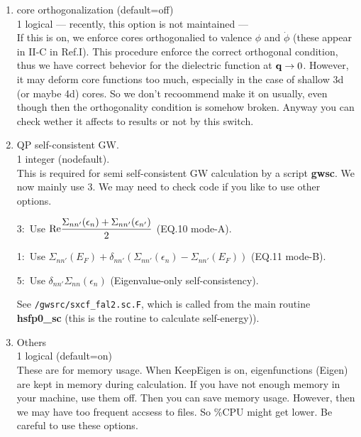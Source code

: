 \documentclass[a4paper,10pt,epsf,fleqn]{article}
\newcommand{\GW}{$GW$}
\newcommand{\keyw}[1]{\fbox{\tt #1}}
\newcommand{\ds}{\displaystyle}
\newcommand{\exe}[1]{{\bf #1}}
\begin{document}
{\begin{enumerate}

\item core orthogonalization (default=off)\\
\keyw{CoreOrth} 1 logical --- recently, this option is not maintained ---\\
If this is on, we enforce cores orthogonalied to valence 
$\phi$ and $\dot{\phi}$ (these appear in II-C in Ref.I).
This procedure enforce the correct orthogonal condition, thus
we have correct behevior for the dielectric function at ${\bf q} \to 0$.
However, it may deform core functions too much, 
especially in the case of shallow 3d (or maybe 4d) cores.
So we don't recoommend make it on usually, even though then 
the orthogonality condition is somehow broken.
Anyway you can check wether it affects to results or not by this switch.


\item QP self-consistent GW.\\
\keyw{iSigMode} 1 integer (nodefault).\\
This is required for semi self-consistent GW calculation by a script {\bf gwsc}.
We now mainly use 3. We may need to check code if you like to use other
options.

3:\ Use $\ds {\rm Re}\frac{\Sigma_{nn'}(\epsilon_n)+\Sigma_{nn'}(\epsilon_{n'})}{2}$
  (EQ.10 mode-A).

1:\ Use $\ds \Sigma_{nn'}(E_F) + \delta_{nn'}(\Sigma_{nn'}(\epsilon_n)-\Sigma_{nn'}(E_F))$
   (EQ.11 mode-B).

5:\ Use $\ds \delta_{nn'} \Sigma_{nn}(\epsilon_n)$ (Eigenvalue-only self-consistency).

See \verb#/gwsrc/sxcf_fal2.sc.F#, which is called from the main routine
      \exe{hsfp0\_sc} (this is the routine to calculate self-energy)).

\item Others\\
\keyw{KeepEigen} 1 logical (default=on) \\
These are for memory usage.
When KeepEigen is on, eigenfunctions (Eigen) are kept in memory during calculation.
If you have not enough memory in your machine, use them off. 
Then you can save memory usage. However, then we may have too frequent accsess to files.
So \%CPU might get lower. Be careful to use these options.



\end{enumerate}}
\end{document}
